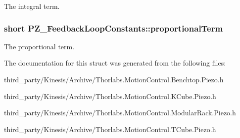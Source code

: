 The integral term. 

\subsubsection[{\texorpdfstring{proportional\+Term}{proportionalTerm}}]{\setlength{\rightskip}{0pt plus 5cm}short P\+Z\+\_\+\+Feedback\+Loop\+Constants\+::proportional\+Term}\hypertarget{struct_p_z___feedback_loop_constants_aa6a8de8a1dbbf95a1f47aa6332bf863c}{}\label{struct_p_z___feedback_loop_constants_aa6a8de8a1dbbf95a1f47aa6332bf863c}


The proportional term. 



The documentation for this struct was generated from the following files\+:\begin{DoxyCompactItemize}
\item 
third\+\_\+party/\+Kinesis/\+Archive/Thorlabs.\+Motion\+Control.\+Benchtop.\+Piezo.\+h\item 
third\+\_\+party/\+Kinesis/\+Archive/Thorlabs.\+Motion\+Control.\+K\+Cube.\+Piezo.\+h\item 
third\+\_\+party/\+Kinesis/\+Archive/Thorlabs.\+Motion\+Control.\+Modular\+Rack.\+Piezo.\+h\item 
third\+\_\+party/\+Kinesis/\+Archive/Thorlabs.\+Motion\+Control.\+T\+Cube.\+Piezo.\+h\end{DoxyCompactItemize}
